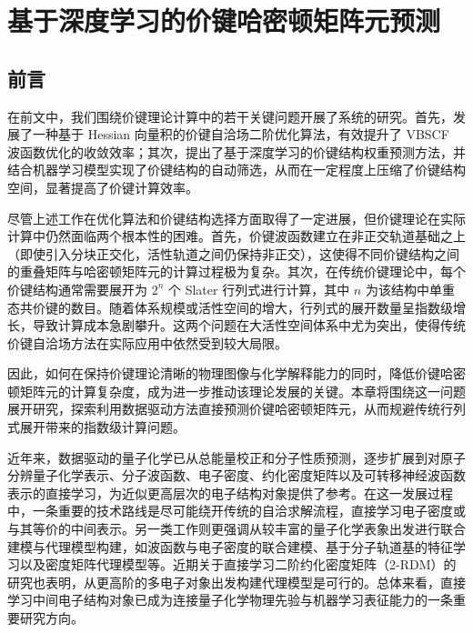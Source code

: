 \chapter{基于深度学习的价键哈密顿矩阵元预测}

\section{前言}

在前文中，我们围绕价键理论计算中的若干关键问题开展了系统的研究。首先，发展了一种基于 Hessian 向量积的价键自洽场二阶优化算法，有效提升了 VBSCF 波函数优化的收敛效率；其次，提出了基于深度学习的价键结构权重预测方法，并结合机器学习模型实现了价键结构的自动筛选，从而在一定程度上压缩了价键结构空间，显著提高了价键计算效率。

尽管上述工作在优化算法和价键结构选择方面取得了一定进展，但价键理论在实际计算中仍然面临两个根本性的困难。首先，价键波函数建立在非正交轨道基础之上（即使引入分块正交化，活性轨道之间仍保持非正交），这使得不同价键结构之间的重叠矩阵与哈密顿矩阵元的计算过程极为复杂。其次，在传统价键理论中，每个价键结构通常需要展开为 $2^n$ 个 Slater 行列式进行计算，其中 $n$ 为该结构中单重态共价键的数目。随着体系规模或活性空间的增大，行列式的展开数量呈指数级增长，导致计算成本急剧攀升。这两个问题在大活性空间体系中尤为突出，使得传统价键自洽场方法在实际应用中依然受到较大局限\cite{shaik2008,chen2013nbodyi,chen2013nbodyii}。

因此，如何在保持价键理论清晰的物理图像与化学解释能力的同时，降低价键哈密顿矩阵元的计算复杂度，成为进一步推动该理论发展的关键。本章将围绕这一问题展开研究，探索利用数据驱动方法直接预测价键哈密顿矩阵元，从而规避传统行列式展开带来的指数级计算问题。

近年来，数据驱动的量子化学已从总能量校正和分子性质预测，逐步扩展到对原子分辨量子化学表示、分子波函数、电子密度、约化密度矩阵以及可转移神经波函数表示的直接学习，为近似更高层次的电子结构对象提供了参考\cite{ramakrishnan2015deltaml,faber2017dftml,schutt2017dtnn,schutt2019schnorb,grisafi2019density,fabrizio2019ncdensity,shao2023rdm,scherbela2024transferable}。在这一发展过程中，一条重要的技术路线是尽可能绕开传统的自洽求解流程，直接学习电子密度或与其等价的中间表示\cite{brockherde2017bypass,cuevas2021density,lewis2021condenseddensity,zepeda2021deepdensity,tawfik2025chargeddensity}。另一类工作则更强调从较丰富的量子化学表象出发进行联合建模与代理模型构建，如波函数与电子密度的联合建模、基于分子轨道基的特征学习以及密度矩阵代理模型等\cite{tsubaki2020qdf,zubatyuk2021aimnetnse,welborn2018mobasis,li2018dftblayer,qiao2020orbnet,fabrizio2022spahm,briling2024spahmab,dick2020neuralxc,shakiba2024ksham,hazra2024opdm,rana2025rdmscf,shmilovich2022orbitalmixer}。近期关于直接学习二阶约化密度矩阵（2-RDM）的研究也表明，从更高阶的多电子对象出发构建代理模型是可行的\cite{sagersmith2022twoelectron,jones2023v2rdmml,delgadogranados2025twordm}。总体来看，直接学习中间电子结构对象已成为连接量子化学物理先验与机器学习表征能力的一条重要研究方向\cite{dral2020age,butler2018mlms,kulik2022roadmap}。

